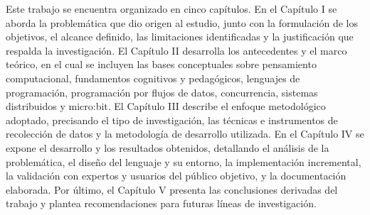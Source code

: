 Este trabajo se encuentra organizado en cinco capítulos. En el Capítulo I se aborda la problemática que dio origen al estudio, junto con la formulación de los objetivos, el alcance definido, las limitaciones identificadas y la justificación que respalda la investigación. El Capítulo II desarrolla los antecedentes y el marco teórico, en el cual se incluyen las bases conceptuales sobre pensamiento computacional, fundamentos cognitivos y pedagógicos, lenguajes de programación, programación por flujos de datos, concurrencia, sistemas distribuidos y micro:bit. El Capítulo III describe el enfoque metodológico adoptado, precisando el tipo de investigación, las técnicas e instrumentos de recolección de datos y la metodología de desarrollo utilizada. En el Capítulo IV se expone el desarrollo y los resultados obtenidos, detallando el análisis de la problemática, el diseño del lenguaje y su entorno, la implementación incremental, la validación con expertos y usuarios del público objetivo, y la documentación elaborada. Por último, el Capítulo V presenta las conclusiones derivadas del trabajo y plantea recomendaciones para futuras líneas de investigación.
